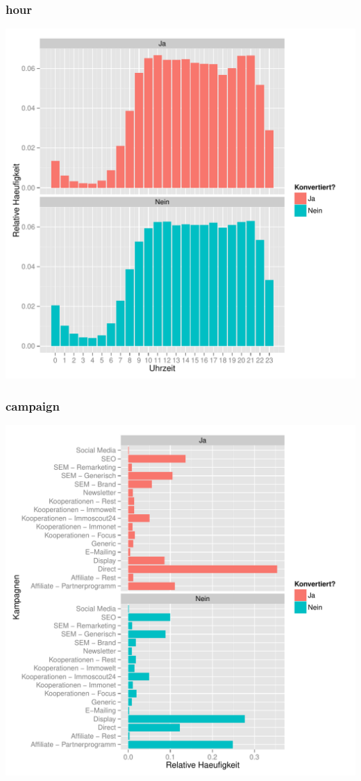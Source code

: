 \begin{frame}\frametitle{hour}
	    \centering\includegraphics[scale=0.3]{hour.pdf}
\end{frame}

\begin{frame}\frametitle{campaign}
	    \centering\includegraphics[scale=0.3]{campaign.pdf}
\end{frame}

